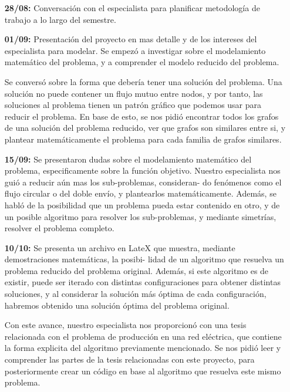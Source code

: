 \documentclass[12pt,twoside]{article}
\begin{document}
	\begin{enumerate}
		\item [\textbf{28/08:}] Conversaci\'on con el especialista para planificar metodolog\'ia de trabajo a lo largo del semestre.
		
		\item [\textbf{01/09:}] Presentaci\'on del proyecto en mas detalle y de los intereses del especialista para modelar. Se empez\'o a investigar sobre el modelamiento matem\'atico del problema, y a comprender el modelo reducido del problema.
		
		Se convers\'o sobre la forma que deber\'ia tener una soluci\'on del problema. Una soluci\'on no puede contener un flujo mutuo entre nodos, y por tanto, las soluciones al problema tienen un patr\'on gr\'afico que podemos usar para reducir el problema. En base de esto, se nos pidi\'o encontrar todos los grafos de una soluci\'on del problema reducido, ver que grafos son similares entre si, y plantear matem\'aticamente el problema para cada familia de grafos similares.
		
		\item [\textbf{15/09:}] Se presentaron dudas sobre el modelamiento matem\'atico del problema, especificamente sobre la funci\'on objetivo. Nuestro especialista nos gui\'o a reducir a\'un mas los sub-problemas, consideran- do fen\'omenos como el flujo circular o del doble env\'io, y plantearlos matem\'aticamente. Adem\'as, se habl\'o de la posibilidad que un problema pueda estar contenido en otro, y de un posible algoritmo para resolver los sub-problemas, y mediante simetr\'ias, resolver el problema completo. 
		
		\item [\textbf{10/10:}] Se presenta un archivo en LateX que muestra, mediante demostraciones matem\'aticas, la posibi- lidad de un algoritmo que resuelva un problema reducido del problema original. Adem\'as, si este algoritmo es de existir, puede ser iterado con distintas configuraciones para obtener distintas soluciones, y al considerar la soluci\'on m\'as \'optima de cada configuraci\'on, habremos obtenido una soluci\'on \'optima del problema original.
		
		Con este avance, nuestro especialista nos proporcion\'o con una tesis relacionada con el problema de producci\'on en una red el\'ectrica, que contiene la forma explicita del algoritmo previamente mencionado. Se nos pidi\'o leer y comprender las partes de la tesis relacionadas con este proyecto, para posteriormente crear un c\'odigo en base al algoritmo que resuelva este mismo problema.
		

\end{enumerate}
\end{document}
